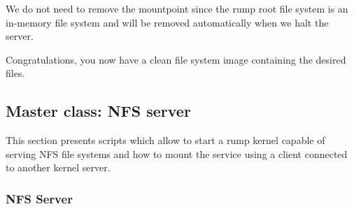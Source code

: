 We do not need to remove the mountpoint since the rump root file
system is an in-memory file system and will be removed automatically
when we halt the server.

Congratulations, you now have a clean file system image containing the
desired files.

\subsection{Master class: NFS server}

This section presents scripts which allow to start a rump kernel
capable of serving NFS file systems and how to mount the service
using a client connected to another kernel server.

\subsubsection{NFS Server}

